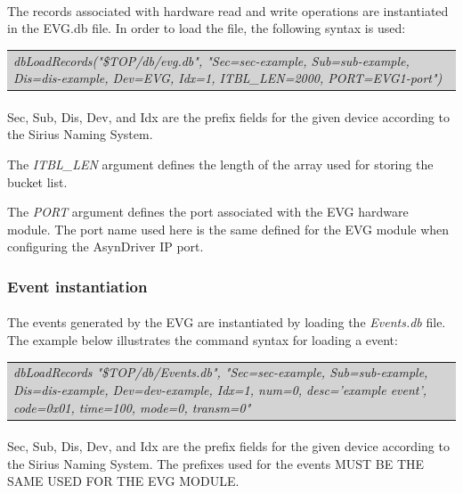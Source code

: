\documentclass[openany]{article}
\begin{document}
			\paragraph{} The records associated with hardware read and write operations are instantiated in the EVG.db file. In order to load the file, the following syntax is used:

		\bigskip
		\colorbox{lightgray}{
			\begin{tabularx}{0.9\textwidth}{X}
			\emph{dbLoadRecords("\${TOP}/db/evg.db", "Sec=sec-example, Sub=sub-example, Dis=dis-example, Dev=EVG, Idx=1, ITBL\_LEN=2000, PORT=EVG1-port")}
			\end{tabularx}
		}

			\paragraph{} Sec, Sub, Dis, Dev, and Idx are the prefix fields for the given device according to the Sirius Naming System.
			\par The \emph{ITBL\_LEN} argument defines the length of the array used for storing the bucket list.
			\par The \emph{PORT} argument defines the port associated with the EVG hardware module. The port name used here is the same defined for the EVG module when configuring the AsynDriver IP port.

		\subsubsection{Event instantiation}\label{sec:event-instantiation}
		
			\paragraph{} The events generated by the EVG are instantiated by loading the \emph{Events.db} file. The example below illustrates the command syntax for loading a event:

			\bigskip
			\colorbox{lightgray}{
				\begin{tabularx}{0.9\textwidth}{X}
				\emph{dbLoadRecords "\${TOP}/db/Events.db", "Sec=sec-example, Sub=sub-example, Dis=dis-example, Dev=dev-example, Idx=1, num=0, desc='example event', code=0x01, time=100, mode=0, transm=0"}
				\end{tabularx}
			}

			\paragraph{} Sec, Sub, Dis, Dev, and Idx are the prefix fields for the given device according to the Sirius Naming System. The prefixes used for the events MUST BE THE SAME USED FOR THE EVG MODULE.
\end{document}

